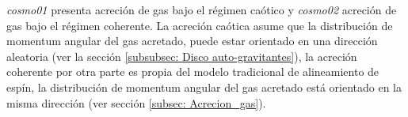 {\it{cosmo01}} presenta acreción de gas bajo el régimen caótico y {\it{cosmo02}} acreción de gas bajo el régimen coherente. La acreción caótica asume que la distribución de momentum angular del gas acretado, puede estar orientado en una dirección aleatoria  
(ver la sección \ref{subsubsec: Disco auto-gravitantes}), la acreción coherente por otra parte es propia del modelo tradicional de alineamiento de espín, la distribución de momentum angular del gas acretado está orientado en la misma dirección
(ver sección \ref{subsec: Acrecion_gas}).











